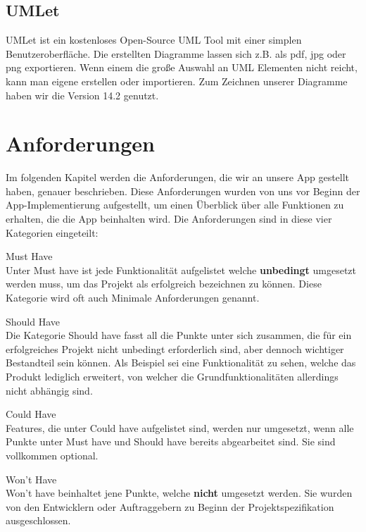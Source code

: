 \subsection{UMLet}

UMLet ist ein kostenloses Open-Source UML Tool mit einer simplen Benutzeroberfläche. Die erstellten Diagramme lassen sich z.B. als pdf, jpg oder png exportieren. Wenn einem die große Auswahl an UML Elementen nicht reicht, kann man eigene erstellen oder importieren. Zum Zeichnen unserer Diagramme haben wir die Version 14.2 genutzt. %

\newpage
\section{Anforderungen}
Im folgenden Kapitel werden die Anforderungen, die wir an unsere App gestellt haben, genauer beschrieben. Diese Anforderungen wurden von uns vor Beginn der App-Implementierung aufgestellt, um einen Überblick über alle Funktionen zu erhalten, die die App beinhalten wird. Die Anforderungen sind in diese vier Kategorien eingeteilt:
\begin{description}
\item Must Have \\
Unter \grqq Must have\grqq{} ist jede Funktionalität aufgelistet welche \textbf{unbedingt} umgesetzt werden muss, um das Projekt als erfolgreich bezeichnen zu können. Diese Kategorie wird oft auch \grqq Minimale Anforderungen\grqq{} genannt.
\item Should Have \\
Die Kategorie \grqq Should have\grqq{} fasst all die Punkte unter sich zusammen, die für ein erfolgreiches Projekt nicht unbedingt erforderlich sind, aber dennoch wichtiger Bestandteil sein können. Als Beispiel sei eine Funktionalität zu sehen, welche das Produkt lediglich erweitert, von welcher die Grundfunktionalitäten allerdings nicht abhängig sind.
\item Could Have \\
Features, die unter \grqq Could have\grqq{} aufgelistet sind, werden nur umgesetzt, wenn alle Punkte unter \grqq Must have\grqq{} und \grqq Should have\grqq{} bereits abgearbeitet sind. Sie sind vollkommen optional.
\item Won't Have \\
\grqq Won't have\grqq{} beinhaltet jene Punkte, welche \textbf{nicht} umgesetzt werden. Sie wurden von den Entwicklern oder Auftraggebern zu Beginn der Projektspezifikation ausgeschlossen.
\end{description}

